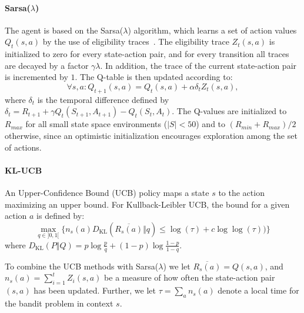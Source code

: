 
\paragraph{Sarsa($\lambda$)}
The agent is based on the Sarsa($\lambda$) algorithm, which learns a set of
action values $Q_t(s,a)$ by the use of eligibility
traces~\cite{Sutton:1998:IRL:551283}. The eligibility trace $Z_t(s,a)$ is
initialized to zero for every state-action pair, and for every transition all
traces are decayed by a factor $\gamma\lambda$. In addition, the trace of the
current state-action pair is incremented by $1$. The Q-table is then updated
according to:
\begin{equation}
        \forall s,a : Q_{t+1}(s,a) = Q_t(s,a) + \alpha\delta_t Z_t(s,a),
\end{equation}
where $\delta_t$ is the temporal difference defined by $\delta_t = R_{t+1} +
\gamma Q_t(S_{t+1},A_{t+1}) - Q_t(S_t,A_t)$. The Q-values are initialized to
$R_{max}$ for all small state space environments ($\vert{S}\vert < 50$) and to
$(R_{min}+R_{max})/2$ otherwise, since an optimistic initialization encourages
exploration among the set of actions.

\paragraph{KL-UCB}
An Upper-Confidence Bound (UCB) policy maps a state $s$ to the action maximizing
an upper bound. For Kullback-Leibler UCB, the bound for a given action $a$ is
defined by:
\begin{equation}
    \max_{q \in ]0,1[}\big\{n_s(a)
        D_{\mathrm{KL}}\left(\overline{R_s(a)}\Big\Vert{q}\right) \le \log(\tau) +
        c\log\log(\tau))\big\}
\end{equation}
where $D_\mathrm{KL}(P\Vert{Q}) = p \log
\frac{p}{q}+(1-p)\log\frac{1-p}{1-q}$.~\cite{DBLP:journals/jmlr/GarivierC11}

To combine the UCB methods with Sarsa($\lambda$) we let
$\overline{R_s(a)}=Q(s,a)$, and $n_s(a)=\sum_{i=1}^tZ_i(s,a)$ be a measure of
how often the state-action pair $(s,a)$ has been updated. Further, we let $\tau
= \sum_a{n_s(a)}$ denote a local time for the bandit problem in context $s$.



